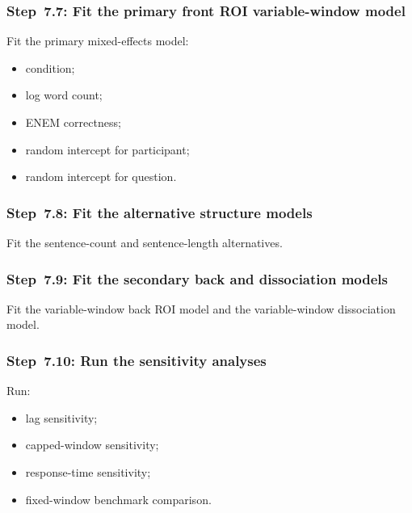 \documentclass[11pt]{article}
\begin{document}
\subsubsection{Step~7.7: Fit the primary front ROI variable-window model}
Fit the primary mixed-effects model:
\begin{itemize}
    \item condition;
    \item log word count;
    \item ENEM correctness;
    \item random intercept for participant;
    \item random intercept for question.
\end{itemize}

\subsubsection{Step~7.8: Fit the alternative structure models}
Fit the sentence-count and sentence-length alternatives.

\subsubsection{Step~7.9: Fit the secondary back and dissociation models}
Fit the variable-window back ROI model and the variable-window dissociation model.

\subsubsection{Step~7.10: Run the sensitivity analyses}
Run:
\begin{itemize}
    \item lag sensitivity;
    \item capped-window sensitivity;
    \item response-time sensitivity;
    \item fixed-window benchmark comparison.
\end{itemize}
\end{document}
